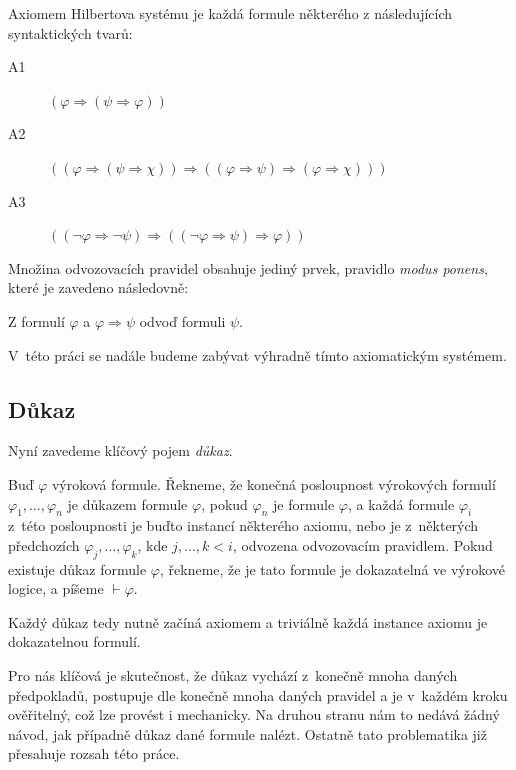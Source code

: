 \documentclass[thesis=B,czech,hidelinks]{thesis}[2012/06/26]
\begin{document}
Axiomem Hilbertova systému je každá formule některého z následujících syntaktických tvarů:

\begin{description}
	\item[A1] $( \varphi \Rightarrow ( \psi \Rightarrow \varphi ))$
	\item[A2] $(( \varphi \Rightarrow ( \psi \Rightarrow \chi )) \Rightarrow (( \varphi \Rightarrow \psi ) \Rightarrow ( \varphi \Rightarrow \chi )))$
	\item[A3] $(( \neg \varphi \Rightarrow \neg \psi ) \Rightarrow (( \neg \varphi \Rightarrow \psi ) \Rightarrow \varphi ))$
\end{description}

Množina odvozovacích pravidel obsahuje jediný prvek, pravidlo \emph{modus ponens}, které je zavedeno následovně:

\begin{dfn}
Z formulí $\varphi$ a $\varphi \Rightarrow \psi$ odvoď formuli $\psi$.
\end{dfn}

V~této práci se nadále budeme zabývat výhradně tímto axiomatickým systémem.

\subsection{Důkaz}

Nyní zavedeme klíčový pojem \emph{důkaz}.

\begin{dfn}
Buď $\varphi$ výroková formule. Řekneme, že konečná posloupnost výrokových formulí $\varphi_1 , \ldots, \varphi_n$ je důkazem formule $\varphi$, pokud $\varphi_n$ je formule $\varphi$, a každá formule $\varphi_i$ z~této posloupnosti je buďto instancí některého axiomu, nebo je z~některých předchozích $\varphi_j, \ldots , \varphi_k$, kde $j, \ldots , k < i$, odvozena odvozovacím pravidlem. Pokud existuje důkaz formule $\varphi$, řekneme, že je tato formule je dokazatelná ve výrokové logice, a píšeme $\vdash \varphi$\cite{stary}.
\end{dfn}

Každý důkaz tedy nutně začíná axiomem a triviálně každá instance axiomu je dokazatelnou formulí.

Pro nás klíčová je skutečnost, že důkaz vychází z~konečně mnoha daných předpokladů, postupuje dle konečně mnoha daných pravidel a je v~každém kroku ověřitelný, což lze provést i mechanicky\cite{stary}. Na druhou stranu nám to nedává žádný návod, jak případně důkaz dané formule nalézt. Ostatně tato problematika již přesahuje rozsah této práce.
\end{document}
